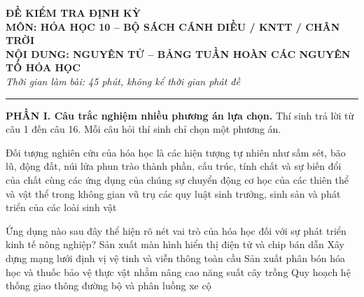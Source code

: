 \begin{center}
    \textbf{\LARGE ĐỀ KIỂM TRA ĐỊNH KỲ}\\
    \textbf{\Large MÔN: HÓA HỌC 10 -- BỘ SÁCH CÁNH DIỀU / KNTT / CHÂN TRỜI}\\
    \textbf{\large NỘI DUNG: NGUYÊN TỬ -- BẢNG TUẦN HOÀN CÁC NGUYÊN TỐ HÓA HỌC}\\
    \textit{Thời gian làm bài: 45 phút, không kể thời gian phát đề}
\end{center}
\hrule
\vspace{0.5cm}

\noindent\textbf{\large PHẦN I. Câu trắc nghiệm nhiều phương án lựa chọn.} Thí sinh trả lời từ câu 1 đến câu 16. Mỗi câu hỏi thí sinh chỉ chọn một phương án.

\begin{ex}
    Đối tượng nghiên cứu của hóa học là
    \choice
    {các hiện tượng tự nhiên như sấm sét, bão lũ, động đất, núi lửa phun trào}
    {\True thành phần, cấu trúc, tính chất và sự biến đổi của chất cùng các ứng dụng của chúng}
    {sự chuyển động cơ học của các thiên thể và vật thể trong không gian vũ trụ}
    {các quy luật sinh trưởng, sinh sản và phát triển của các loài sinh vật}
\end{ex}

\begin{ex}
    Ứng dụng nào sau đây thể hiện rõ nét vai trò của hóa học đối với sự phát triển kinh tế nông nghiệp?
    \choice
    {Sản xuất màn hình hiển thị điện tử và chip bán dẫn}
    {Xây dựng mạng lưới định vị vệ tinh và viễn thông toàn cầu}
    {\True Sản xuất phân bón hóa học và thuốc bảo vệ thực vật nhằm nâng cao năng suất cây trồng}
    {Quy hoạch hệ thống giao thông đường bộ và phân luồng xe cộ}
\end{ex}

